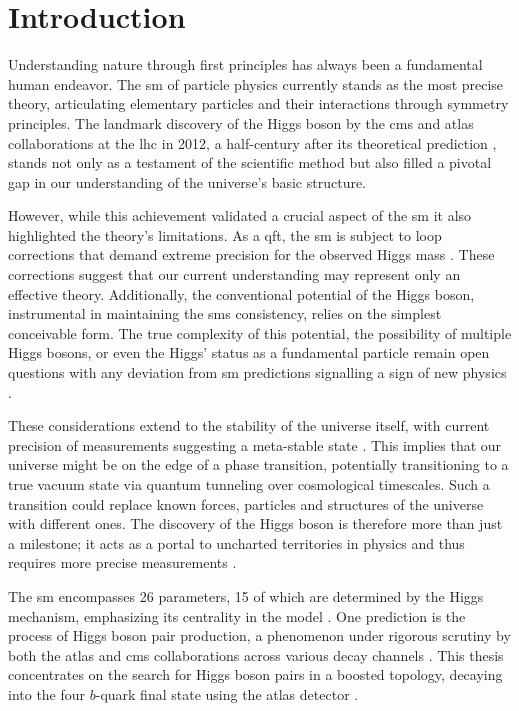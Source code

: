 \chapter{Introduction}
Understanding nature through first principles has always been a fundamental human endeavor. The \ac{sm} of particle physics currently stands as the most precise theory, articulating elementary particles and their interactions through symmetry principles. The landmark discovery of the Higgs boson by the \ac{cms} \citep{higgs-cms} and \ac{atlas} \citep{higgs} collaborations at the \ac{lhc} in 2012, a half-century after its theoretical prediction \citep{PhysRevLett.13.321,PhysRevLett.13.508}, stands not only as a testament of the scientific method but also filled a pivotal gap in our understanding of the universe's basic structure.

However, while this achievement validated a crucial aspect of the \ac{sm} it also highlighted the theory's limitations. As a \ac{qft}, the \ac{sm} is subject to loop corrections that demand extreme precision for the observed Higgs mass \citep{peskin2016trail}. These corrections suggest that our current understanding may represent only an effective theory. Additionally, the conventional potential of the Higgs boson, instrumental in maintaining the \acp{sm} consistency, relies on the simplest conceivable form. The true complexity of this potential, the possibility of multiple Higgs bosons, or even the Higgs' status as a fundamental particle remain open questions with any deviation from \ac{sm} predictions signalling a sign of new physics \citep{PhysRevD.101.075023}. 

These considerations extend to the stability of the universe itself, with current precision of measurements suggesting a meta-stable state \citep{Buttazzo:2013uya}. This implies that our universe might be on the edge of a phase transition, potentially transitioning to a true vacuum state via quantum tunneling over cosmological timescales. Such a transition could replace known forces, particles and structures of the universe with different ones. The discovery of the Higgs boson is therefore more than just a milestone; it acts as a portal to uncharted territories in physics and thus requires more precise measurements \citep{dawsona2022report}.

The \ac{sm} encompasses 26 parameters, 15 of which are determined by the Higgs mechanism, emphasizing its centrality in the model \citep{thomson2013modern}. One prediction is the process of Higgs boson pair production, a phenomenon under rigorous scrutiny by both the \ac{atlas} and \ac{cms} collaborations across various decay channels \citep{GOUZEVITCH2020100039}. This thesis concentrates on the search for Higgs boson pairs in a boosted topology, decaying into the four $b$-quark final state using the \ac{atlas} detector \citep{atlas2018search}.

